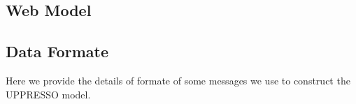 
\begin{appendices}

\renewcommand{\algorithmicrequire}{\textbf{Input:}}  
\newcommand{\deflet}{\textbf{let}}
\newcommand{\mystate}[1]{\STATE \textbf{let} {{}#1}}
\newcommand{\mystop}[1]{\STATE \textbf{stop} \myss{\myangle{{{}#1}}, s'}}
\newcommand{\myss}[1]{${{}#1}$}
\newcommand{\myangle}[1]{\langle {{}#1} \rangle}
\newcommand{\myif}[1]{\IF{\myss{{{}#1}}}}
\newcommand{\myelse}[1]{\ELSIF{\myss{{{}#1}}}}

\newcommand{\SWITCH}[1]{\STATE \textbf{switch} #1\ \textbf{do} \begin{ALC@g}}
\newcommand{\ENDSWITCH}{\end{ALC@g}\STATE \textbf{end switch}}
\newcommand{\CASE}[1]{\STATE \textbf{case} #1\textbf{:} \begin{ALC@g}}
\newcommand{\ENDCASE}{\end{ALC@g}}
\newcommand{\CASELINE}[1]{\STATE \textbf{case} #1\textbf{:} }
\newcommand{\DEFAULT}{\STATE \textbf{default:} \begin{ALC@g}}
\newcommand{\ENDDEFAULT}{\end{ALC@g}}
\newcommand{\DEFAULTLINE}[1]{\STATE \textbf{default:} }

\section{Web Model}
\subsection{Data Formate}
Here we provide the details of formate of some messages we use to construct the UPPRESSO model.


\end{appendices}

